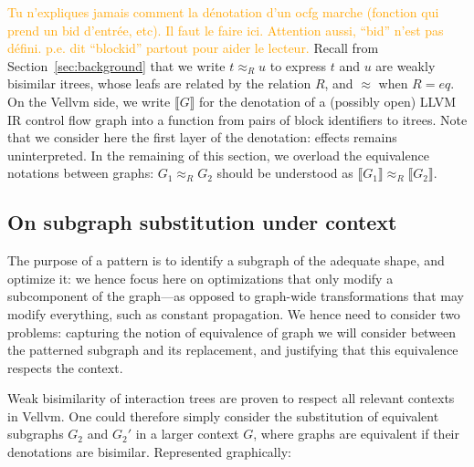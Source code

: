 \documentclass[11pt]{article}
\newcommand{\gr}[1]{\textcolor{Orange}{#1}}
\newcommand{\yz}[1]{\textcolor{ForestGreen}{#1}}
\newcommand{\yzt}[1]{\textcolor{ForestGreen!50}{#1}}
\begin{document}
\gr{Tu n'expliques jamais comment la dénotation d'un ocfg marche (fonction qui prend un bid d'entrée, etc). Il faut le faire ici. Attention aussi, ``bid'' n'est pas défini. p.e. dit ``blockid'' partout pour aider le lecteur.}
Recall from Section~\ref{sec:background} that we write $t \approx_R u$ to express $t$ and $u$ are weakly bisimilar itrees, whose leafs are related by the relation $R$, and $\approx$ when $R=eq$. On the Vellvm side, we write $\llbracket G \rrbracket$ for the denotation of a (possibly open) LLVM IR control flow graph into a function from pairs of block identifiers to itrees. Note that we consider here the first layer of the denotation: effects remains uninterpreted.
In the remaining of this section, we overload the equivalence notations between graphs: $G_1 \approx_R G_2$ should be understood as $\llbracket G_1\rrbracket \approx_R \llbracket G_2\rrbracket$.

\subsection{On subgraph substitution under context}

The purpose of a pattern is to identify a subgraph of the adequate shape, and optimize it: we hence focus here on optimizations that only modify a subcomponent of the graph---as opposed to graph-wide transformations that may modify everything, such as constant propagation. We hence need to consider two problems: capturing the notion of equivalence of graph we will consider between the patterned subgraph and its replacement, and justifying that this equivalence respects the context.




\yzt{Weak bisimilarity of interaction trees are proven to respect all relevant contexts in Vellvm. One could therefore simply consider the substitution of equivalent subgraphs $G_2$ and $G_2'$ in a larger context $G$, where graphs are equivalent if their denotations are bisimilar. Represented graphically:}
\end{document}

